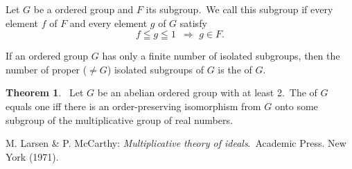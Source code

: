 \documentclass[12pt]{article}
\theoremstyle{definition}
\newtheorem*{thmplain}{Theorem}
\begin{document}
Let $G$ be a  ordered group and $F$ its subgroup. \,We call this subgroup  if every element $f$ of $F$ and every element $g$ of $G$ satisfy
$$f \leqq g \leqq 1 \,\,\,\Rightarrow \,\, g\in F.$$

If an ordered group $G$ has only a finite number of isolated subgroups, then the number of proper ($\neq G$) isolated subgroups of $G$ is the  of $G$.

\begin{thmplain}
 \, Let $G$ be an abelian ordered group with  at least 2. \,The  of $G$ equals one iff there is an order-preserving isomorphism from $G$ onto some subgroup of the multiplicative group of real numbers.
\end{thmplain}

\begin{thebibliography}{9}
 {\sc M. Larsen \& P. McCarthy}: {\em Multiplicative theory of ideals}. \,Academic Press. New York (1971).
\end{thebibliography}
\end{document}
